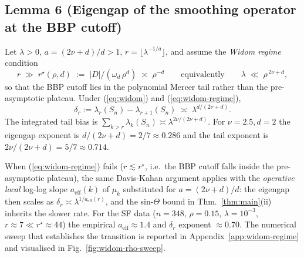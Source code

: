 \subsection*{Lemma 6 (Eigengap of the smoothing operator at the BBP cutoff)}

\begin{lemma}\label{lem:eigengap}
Let $\lambda>0$, $a=(2\nu+d)/d>1$, $r=\lfloor\lambda^{-1/a}\rfloor$, and assume
the \emph{Widom regime} condition
\begin{equation}\label{eq:widom-regime}
r \;\gg\; r^\star(\rho,d) \;:=\; |D|/(\omega_d\,\rho^d)
\;\asymp\; \rho^{-d}\qquad\text{equivalently}\qquad
\lambda \;\ll\; \rho^{\,2\nu+d},
\end{equation}
so that the BBP cutoff lies in the polynomial Mercer tail rather than the
pre-asymptotic plateau. Under (\ref{eq:widom}) and (\ref{eq:widom-regime}),
\begin{equation}\label{eq:eigengap-bbp}
\delta_r:=\lambda_r(S_n)-\lambda_{r+1}(S_n)\;\asymp\;\lambda^{d/(2\nu+d)}.
\end{equation}
The integrated tail bias is
$\sum_{k>r}\lambda_k(S_n)\asymp\lambda^{2\nu/(2\nu+d)}$. For $\nu=2.5,d=2$
the eigengap exponent is $d/(2\nu+d)=2/7\approx 0.286$ and the tail exponent
is $2\nu/(2\nu+d)=5/7\approx 0.714$.

When (\ref{eq:widom-regime}) fails ($r\lesssim r^\star$, i.e.\ the BBP cutoff
falls inside the pre-asymptotic plateau), the same Davis-Kahan argument applies
with the \emph{operative local} log-log slope $a_{\mathrm{eff}}(k)$ of $\mu_k$
substituted for $a=(2\nu+d)/d$: the eigengap then scales as
$\delta_r\asymp\lambda^{1/a_{\mathrm{eff}}(r)}$, and the sin-$\Theta$ bound in
Thm.~\ref{thm:main}(ii) inherits the slower rate. For the SF data
($n=348$, $\rho=0.15$, $\lambda=10^{-3}$, $r\approx 7\ll r^\star\approx 44$) the
empirical $a_{\mathrm{eff}}\approx 1.4$ and $\delta_r$ exponent $\approx 0.70$.
The numerical sweep that establishes the transition is reported in
Appendix~\ref{app:widom-regime} and visualised in
Fig.~\ref{fig:widom-rho-sweep}.
\end{lemma}

